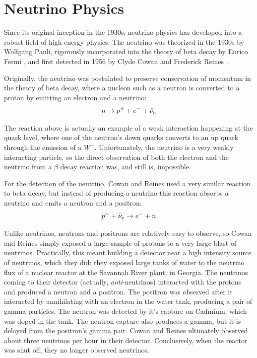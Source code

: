 \chapter{\label{chp:intro} Neutrino Physics}


Since its original inception in the 1930s, neutrino physics has developed into a robust field of high energy physics.  The neutrino was theorized in the 1930s by Wolfgang Pauli, rigorously incorporated into the theory of beta decay by Enrico Fermi \cite{Fermi}, and first detected in 1956 by Clyde Cowan and Frederick Reines \cite{cowanReines}.

Originally, the neutrino was postulated to preserve conservation of momentum in the theory of beta decay, where a nucleon such as a neutron is converted to a proton by emitting an electron and a neutrino:
\begin{equation}
\label{beta_decay}
n \rightarrow p^+ + e^- + \bar\nu_{e}
\end{equation}

The reaction above is actually an example of a weak interaction happening at the quark level, where one of the neutron's down quarks converts to an up quark through the emission of a $W^-$.  Unfortunately, the neutrino is a very weakly interacting particle, so the direct observation of both the electron and the neutrino from a $\beta$ decay reaction was, and still is, impossible.  

For the detection of the neutrino, Cowan and Reines used a very similar reaction to beta decay, but instead of producing a neutrino this reaction absorbs a neutrino and emits a neutron and a positron:
\begin{equation}
\label{inverse_beta_decay}
p^+  + \bar\nu_{e} \rightarrow e^- + n 
\end{equation}

Unlike neutrinos, neutrons and positrons are relatively easy to observe, so Cowan and Reines simply exposed a large sample of protons to a very large blast of neutrinos.  Practically, this meant building a detector near a high intensity source of neutrinos, which they did: they exposed large tanks of water to the neutrino flux of a nuclear reactor at the Savannah River plant, in Georgia.  The neutrinos coming to their detector (actually, {\em anti}-neutrinos) interacted with the protons and produced a neutron and a positron.  The positron was observed after it interacted by annihilating with an electron in the water tank, producing a pair of gamma particles.  The neutron was detected by it's capture on Cadmium, which was doped in the tank.  The neutron capture also produces a gamma, but it is delayed from the positron's gamma pair.  Cowan and Reines ultimately observed about three neutrinos per hour in their detector.  Conclusively, when the reactor was shut off, they no longer observed neutrinos. 


